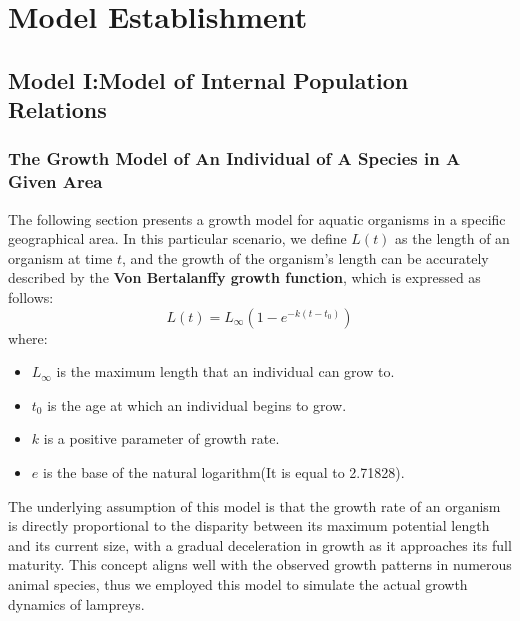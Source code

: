 \documentclass[12pt]{article}  %
\begin{document}
\section{Model Establishment}
\subsection{Model I:Model of Internal Population Relations }
\subsubsection{The Growth Model of An Individual of A Species in A Given Area }
The following section presents a growth model for aquatic organisms in a specific geographical area. In this particular scenario, we define $L(t)$ as the length of an organism at time $ t$, and the growth of the organism's length can be accurately described by the \textbf{Von Bertalanffy growth function}, which is expressed as follows:
\begin{equation}
	L\left( t \right) =L_{\infty}\left( 1-e^{-k\left( t-t_0 \right)} \right) 
\end{equation}
where:
\begin{itemize}
	\setlength{\parsep}{0ex} %
	\setlength{\topsep}{2ex} %
	\setlength{\itemsep}{1ex} %
	\item $L_{\infty}$ is the maximum length that an individual can grow to.
	\item $t_{0}$ is the age at which an individual begins to grow.
	\item $k$ is a positive parameter of growth rate.
	\item $e$ is the base of the natural logarithm(It is equal to 2.71828).
\end{itemize}

The underlying assumption of this model is that the growth rate of an organism is directly proportional to the disparity between its maximum potential length and its current size, with a gradual deceleration in growth as it approaches its full maturity.  This concept aligns well with the observed growth patterns in numerous animal species, thus we employed this model to simulate the actual growth dynamics of lampreys.
\end{document}

